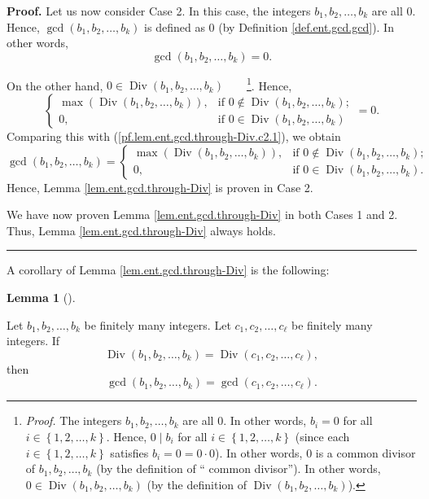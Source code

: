 \documentclass[numbers=enddot,12pt,final,onecolumn,notitlepage]{scrartcl}%
\numberwithin{exer}{subsection}
\theoremstyle{definition}
\newtheorem{lem}[theo]{Lemma}
\newenvironment{lemma}[1][]
{\begin{lem}[#1]\begin{leftbar}}
{\end{leftbar}\end{lem}}
\newenvironment{proof}[1][Proof]{\noindent\textbf{#1.} }{\ \rule{0.5em}{0.5em}}
\begin{document}
\begin{proof}
Let us now consider Case 2. In this case, the integers $b_{1},b_{2}%
,\ldots,b_{k}$ are all $0$. Hence, $\gcd\left(  b_{1},b_{2},\ldots
,b_{k}\right)  $ is defined as $0$ (by Definition \ref{def.ent.gcd.gcd}). In
other words,
\begin{equation}
\gcd\left(  b_{1},b_{2},\ldots,b_{k}\right)  =0.
\label{pf.lem.ent.gcd.through-Div.c2.1}%
\end{equation}


On the other hand, $0\in\operatorname*{Div}\left(  b_{1},b_{2},\ldots
,b_{k}\right)  $\ \ \ \ \footnote{\textit{Proof.} The integers $b_{1}%
,b_{2},\ldots,b_{k}$ are all $0$. In other words, $b_{i}=0$ for all
$i\in\left\{  1,2,\ldots,k\right\}  $. Hence, $0\mid b_{i}$ for all
$i\in\left\{  1,2,\ldots,k\right\}  $ (since each $i\in\left\{  1,2,\ldots
,k\right\}  $ satisfies $b_{i}=0=0\cdot0$). In other words, $0$ is a common
divisor of $b_{1},b_{2},\ldots,b_{k}$ (by the definition of \textquotedblleft
common divisor\textquotedblright). In other words, $0\in\operatorname*{Div}%
\left(  b_{1},b_{2},\ldots,b_{k}\right)  $ (by the definition of
$\operatorname*{Div}\left(  b_{1},b_{2},\ldots,b_{k}\right)  $).}. Hence,%
\[%
\begin{cases}
\max\left(  \operatorname*{Div}\left(  b_{1},b_{2},\ldots,b_{k}\right)
\right)  , & \text{if }0\notin\operatorname*{Div}\left(  b_{1},b_{2}%
,\ldots,b_{k}\right)  ;\\
0, & \text{if }0\in\operatorname*{Div}\left(  b_{1},b_{2},\ldots,b_{k}\right)
\end{cases}
=0.
\]
Comparing this with (\ref{pf.lem.ent.gcd.through-Div.c2.1}), we obtain%
\[
\gcd\left(  b_{1},b_{2},\ldots,b_{k}\right)  =%
\begin{cases}
\max\left(  \operatorname*{Div}\left(  b_{1},b_{2},\ldots,b_{k}\right)
\right)  , & \text{if }0\notin\operatorname*{Div}\left(  b_{1},b_{2}%
,\ldots,b_{k}\right)  ;\\
0, & \text{if }0\in\operatorname*{Div}\left(  b_{1},b_{2},\ldots,b_{k}\right)
.
\end{cases}
\]
Hence, Lemma \ref{lem.ent.gcd.through-Div} is proven in Case 2.

We have now proven Lemma \ref{lem.ent.gcd.through-Div} in both Cases 1 and 2.
Thus, Lemma \ref{lem.ent.gcd.through-Div} always holds.
\end{proof}

A corollary of Lemma \ref{lem.ent.gcd.through-Div} is the following:

\begin{lemma}
\label{lem.ent.gcd.through-Divc}Let $b_{1},b_{2},\ldots,b_{k}$ be finitely
many integers. Let $c_{1},c_{2},\ldots,c_{\ell}$ be finitely many integers. If%
\[
\operatorname*{Div}\left(  b_{1},b_{2},\ldots,b_{k}\right)
=\operatorname*{Div}\left(  c_{1},c_{2},\ldots,c_{\ell}\right)  ,
\]
then%
\[
\gcd\left(  b_{1},b_{2},\ldots,b_{k}\right)  =\gcd\left(  c_{1},c_{2}%
,\ldots,c_{\ell}\right)  .
\]

\end{lemma}
\end{document}
